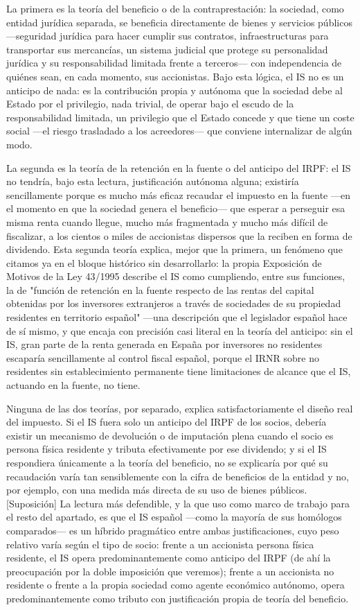 \documentclass[10pt,a4paper]{article}
\begin{document}
La primera es la teoría del beneficio o de la contraprestación: la sociedad, como entidad jurídica separada, se beneficia directamente de bienes y servicios públicos —seguridad jurídica para hacer cumplir sus contratos, infraestructuras para transportar sus mercancías, un sistema judicial que protege su personalidad jurídica y su responsabilidad limitada frente a terceros— con independencia de quiénes sean, en cada momento, sus accionistas. Bajo esta lógica, el IS no es un anticipo de nada: es la contribución propia y autónoma que la sociedad debe al Estado por el privilegio, nada trivial, de operar bajo el escudo de la responsabilidad limitada, un privilegio que el Estado concede y que tiene un coste social —el riesgo trasladado a los acreedores— que conviene internalizar de algún modo.

La segunda es la teoría de la retención en la fuente o del anticipo del IRPF: el IS no tendría, bajo esta lectura, justificación autónoma alguna; existiría sencillamente porque es mucho más eficaz recaudar el impuesto en la fuente —en el momento en que la sociedad genera el beneficio— que esperar a perseguir esa misma renta cuando llegue, mucho más fragmentada y mucho más difícil de fiscalizar, a los cientos o miles de accionistas dispersos que la reciben en forma de dividendo. Esta segunda teoría explica, mejor que la primera, un fenómeno que citamos ya en el bloque histórico sin desarrollarlo: la propia Exposición de Motivos de la Ley 43/1995 describe el IS como cumpliendo, entre sus funciones, la de "función de retención en la fuente respecto de las rentas del capital obtenidas por los inversores extranjeros a través de sociedades de su propiedad residentes en territorio español" —una descripción que el legislador español hace de sí mismo, y que encaja con precisión casi literal en la teoría del anticipo: sin el IS, gran parte de la renta generada en España por inversores no residentes escaparía sencillamente al control fiscal español, porque el IRNR sobre no residentes sin establecimiento permanente tiene limitaciones de alcance que el IS, actuando en la fuente, no tiene.

Ninguna de las dos teorías, por separado, explica satisfactoriamente el diseño real del impuesto. Si el IS fuera solo un anticipo del IRPF de los socios, debería existir un mecanismo de devolución o de imputación plena cuando el socio es persona física residente y tributa efectivamente por ese dividendo; y si el IS respondiera únicamente a la teoría del beneficio, no se explicaría por qué su recaudación varía tan sensiblemente con la cifra de beneficios de la entidad y no, por ejemplo, con una medida más directa de su uso de bienes públicos. [Suposición] La lectura más defendible, y la que uso como marco de trabajo para el resto del apartado, es que el IS español —como la mayoría de sus homólogos comparados— es un híbrido pragmático entre ambas justificaciones, cuyo peso relativo varía según el tipo de socio: frente a un accionista persona física residente, el IS opera predominantemente como anticipo del IRPF (de ahí la preocupación por la doble imposición que veremos); frente a un accionista no residente o frente a la propia sociedad como agente económico autónomo, opera predominantemente como tributo con justificación propia de teoría del beneficio.
\end{document}
